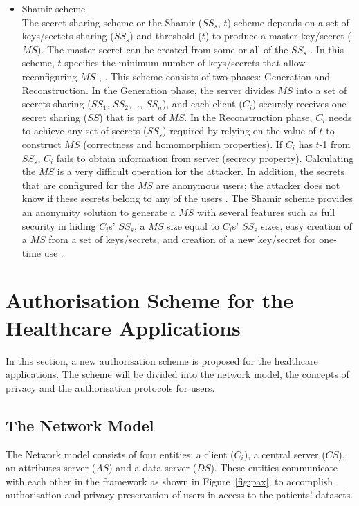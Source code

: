 \documentclass[journal,article,submit,moreauthors,pdftex]{Definitions/mdpi}
\begin{document}
\begin{itemize}
\item Shamir scheme\\
The secret sharing scheme or the Shamir ($SS_s$, $t$) scheme depends on a set of keys/sectets sharing ($SS_s$) and threshold ($t$) to produce a master key/secret ($MS$). The master secret can be created from some or all of the $SS_s$ \cite{fp39}. In this scheme, $t$ specifies the minimum number of keys/secrets that allow reconfiguring $MS$ \cite{fp40}, \cite{fp41}. This scheme consists of two phases: Generation and Reconstruction. In the Generation phase, the server divides $MS$ into a set of secrets sharing ($SS_1$, $SS_2$, .., $SS_n$), and each client ($C_i$) securely receives one secret sharing ($SS$) that is part of $MS$. In the Reconstruction phase, $C_i$ needs to achieve any set of secrets ($SS_s$) required by relying on the value of $t$ to construct $MS$ (correctness and homomorphism properties). If $C_i$ has $t$-1 from $SS_s$, $C_i$ fails to obtain information from server (secrecy property). Calculating the $MS$ is a very difficult operation for the attacker. In addition, the secrets that are configured for the $MS$ are anonymous users; the attacker does not know if these secrets belong to any of the users \cite{fp2}. The Shamir scheme provides an anonymity solution to generate a $MS$ with several features such as full security in hiding $C_i$s' $SS_s$, a $MS$ size equal to $C_i$s' $SS_s$ sizes, easy creation of a $MS$ from a set of keys/secrets, and creation of a new key/secret for one-time use \cite{fp26}.
\end{itemize}

\section{Authorisation Scheme for the Healthcare Applications}
\label{sec:our_proposed}
In this section, a new authorisation scheme is proposed for the healthcare applications. The scheme
will be divided into the network model, the concepts of privacy and the authorisation protocols
for users.

\subsection{The Network Model}
 The Network model consists of four entities: a client ($C_i$), a central server ($CS$), an
 attributes server ($AS$) and a data server ($DS$). These entities communicate with each
 other in the framework as shown in Figure~\ref{fig:pax}, to accomplish authorisation and
 privacy preservation of users in access to the patients' datasets.
\end{document}
